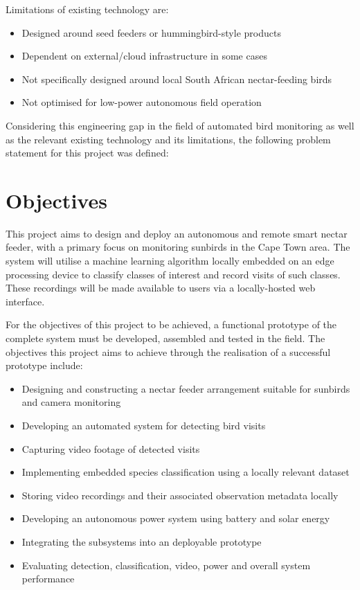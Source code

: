 \par\vspace{6pt}
Limitations of existing technology are:
\begin{itemize}
	\item Designed around seed feeders or hummingbird-style products
    \item Dependent on external/cloud infrastructure in some cases
    \item Not specifically designed around local South African nectar-feeding birds
    \item Not optimised for low-power autonomous field operation
\end{itemize}

Considering this engineering gap in the field of automated bird monitoring as well as the relevant existing technology and its limitations, the following problem statement for this project was defined:

\section{Objectives}

This project aims to design and deploy an autonomous and remote smart nectar feeder, with a primary focus on monitoring sunbirds in the Cape Town area. The system will utilise a machine learning algorithm locally embedded on an edge processing device to classify classes of interest and record visits of such classes. These recordings will be made available to users via a locally-hosted web interface. 
\par\vspace{6pt}
For the objectives of this project to be achieved, a functional prototype of the complete system must be developed, assembled and tested in the field. The objectives this project aims to achieve through the realisation of a successful prototype include:

\begin{itemize}
  \item Designing and constructing a nectar feeder arrangement suitable for sunbirds and camera monitoring
  \item Developing an automated system for detecting bird visits
  \item Capturing video footage of detected visits
  \item Implementing embedded species classification using a locally relevant dataset
  \item Storing video recordings and their associated observation metadata locally
  \item Developing an autonomous power system using battery and solar energy
  \item Integrating the subsystems into an deployable prototype
  \item Evaluating detection, classification, video, power and overall system performance
\end{itemize}

